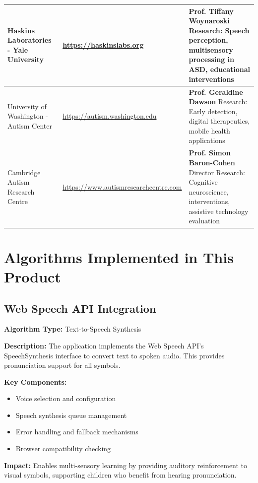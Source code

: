 \documentclass[12pt,a4paper]{article}
\begin{document}
\begin{longtable}{|>{\raggedright}p{4.8cm}|>{\raggedright}p{4.2cm}|>{\raggedright\arraybackslash}p{5.5cm}|}
Haskins Laboratories - Yale University & 
\url{https://haskinslabs.org} & 
\textbf{Prof. Tiffany Woynaroski}
\newline Research: Speech perception, multisensory processing in ASD, educational interventions \\
\hline

University of Washington - Autism Center & 
\url{https://autism.washington.edu} & 
\textbf{Prof. Geraldine Dawson}
\newline Research: Early detection, digital therapeutics, mobile health applications \\
\hline

Cambridge Autism Research Centre & 
\url{https://www.autismresearchcentre.com} & 
\textbf{Prof. Simon Baron-Cohen}
\newline Director
\newline Research: Cognitive neuroscience, interventions, assistive technology evaluation \\
\hline

\end{longtable}
\renewcommand{\arraystretch}{1}

\newpage
\section{Algorithms Implemented in This Product}

\subsection{Web Speech API Integration}
\textbf{Algorithm Type:} Text-to-Speech Synthesis

\textbf{Description:} 
The application implements the Web Speech API's SpeechSynthesis interface to convert text to spoken audio. This provides pronunciation support for all symbols.

\textbf{Key Components:}
\begin{itemize}
    \item Voice selection and configuration
    \item Speech synthesis queue management
    \item Error handling and fallback mechanisms
    \item Browser compatibility checking
\end{itemize}

\textbf{Impact:}
Enables multi-sensory learning by providing auditory reinforcement to visual symbols, supporting children who benefit from hearing pronunciation.
\end{document}

